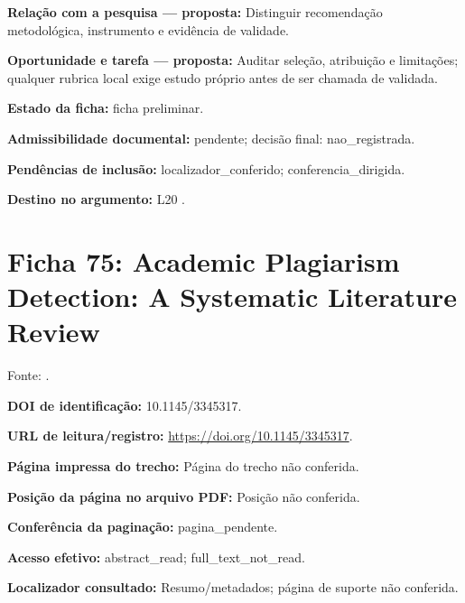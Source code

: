 \noindent\textbf{Relação com a pesquisa — proposta:} Distinguir recomendação metodológica, instrumento e evidência de validade.\par\medskip

\noindent\textbf{Oportunidade e tarefa — proposta:} Auditar seleção, atribuição e limitações; qualquer rubrica local exige estudo próprio antes de ser chamada de validada.\par\medskip

\noindent\textbf{Estado da ficha:} ficha preliminar.\par\medskip

\noindent\textbf{Admissibilidade documental:} pendente; decisão final: nao\_registrada.\par\medskip

\noindent\textbf{Pendências de inclusão:} localizador\_conferido; conferencia\_dirigida.\par\medskip

\noindent\textbf{Destino no argumento:} L20 .

\clearpage\section*{Ficha 75: Academic Plagiarism Detection: A Systematic Literature Review}

Fonte: \citet{SU05}.

\noindent\textbf{DOI de identificação:} 10.1145/3345317.\par\medskip

\noindent\textbf{URL de leitura/registro:} \url{https://doi.org/10.1145/3345317}.\par\medskip

\noindent\textbf{Página impressa do trecho:} Página do trecho não conferida.\par\medskip

\noindent\textbf{Posição da página no arquivo PDF:} Posição não conferida.\par\medskip

\noindent\textbf{Conferência da paginação:} pagina\_pendente.\par\medskip

\noindent\textbf{Acesso efetivo:} abstract\_read; full\_text\_not\_read.\par\medskip

\noindent\textbf{Localizador consultado:} Resumo/metadados; página de suporte não conferida.\par\medskip

